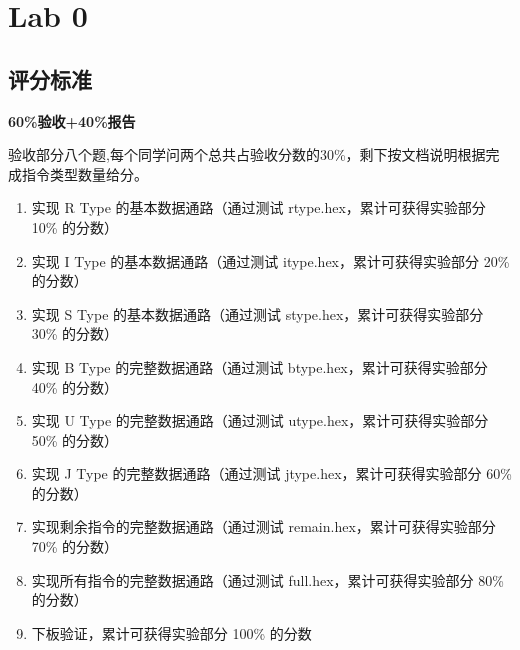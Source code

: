 \chapter{Lab 0}

\section{评分标准}
\textbf{60\%验收+40\%报告}

验收部分八个题,每个同学问两个总共占验收分数的30\%，剩下按文档说明根据完成指令类型数量给分。
\begin{enumerate}
\item 实现 R Type 的基本数据通路（通过测试 rtype.hex，累计可获得实验部分 10\% 的分数）
\item 实现 I Type 的基本数据通路（通过测试 itype.hex，累计可获得实验部分 20\% 的分数）
\item 实现 S Type 的基本数据通路（通过测试 stype.hex，累计可获得实验部分 30\% 的分数）
\item 实现 B Type 的完整数据通路（通过测试 btype.hex，累计可获得实验部分 40\% 的分数）
\item 实现 U Type 的完整数据通路（通过测试 utype.hex，累计可获得实验部分 50\% 的分数）
\item 实现 J Type 的完整数据通路（通过测试 jtype.hex，累计可获得实验部分 60\% 的分数）
\item 实现剩余指令的完整数据通路（通过测试 remain.hex，累计可获得实验部分 70\% 的分数）
\item 实现所有指令的完整数据通路（通过测试 full.hex，累计可获得实验部分 80\% 的分数）
\item 下板验证，累计可获得实验部分 100\% 的分数
\end{enumerate}
